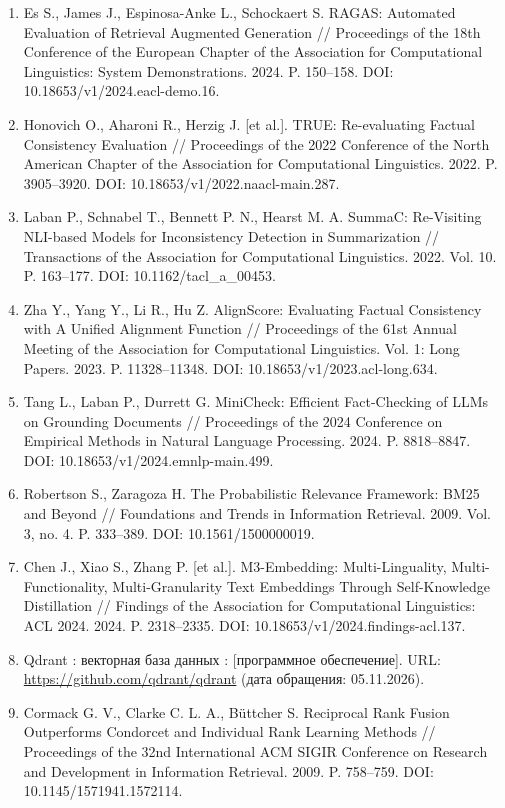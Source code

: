 \documentclass[14pt,a4paper]{extarticle}
\begin{document}
\begin{singlespace*}
\begin{enumerate}
\item \foreignlanguage{english}{Es S., James J., Espinosa-Anke L., Schockaert S. RAGAS: Automated Evaluation of Retrieval Augmented Generation // Proceedings of the 18th Conference of the European Chapter of the Association for Computational Linguistics: System Demonstrations. 2024. P. 150–158. DOI: 10.18653/v1/2024.eacl-demo.16.}
\item \foreignlanguage{english}{Honovich O., Aharoni R., Herzig J. [et al.]. TRUE: Re-evaluating Factual Consistency Evaluation // Proceedings of the 2022 Conference of the North American Chapter of the Association for Computational Linguistics. 2022. P. 3905–3920. DOI: 10.18653/v1/2022.naacl-main.287.}
\item \foreignlanguage{english}{Laban P., Schnabel T., Bennett P. N., Hearst M. A. SummaC: Re-Visiting NLI-based Models for Inconsistency Detection in Summarization // Transactions of the Association for Computational Linguistics. 2022. Vol. 10. P. 163–177. DOI: 10.1162/tacl\_a\_00453.}
\item \foreignlanguage{english}{Zha Y., Yang Y., Li R., Hu Z. AlignScore: Evaluating Factual Consistency with A Unified Alignment Function // Proceedings of the 61st Annual Meeting of the Association for Computational Linguistics. Vol. 1: Long Papers. 2023. P. 11328–11348. DOI: 10.18653/v1/2023.acl-long.634.}
\item \foreignlanguage{english}{Tang L., Laban P., Durrett G. MiniCheck: Efficient Fact-Checking of LLMs on Grounding Documents // Proceedings of the 2024 Conference on Empirical Methods in Natural Language Processing. 2024. P. 8818–8847. DOI: 10.18653/v1/2024.emnlp-main.499.}
\item \foreignlanguage{english}{Robertson S., Zaragoza H. The Probabilistic Relevance Framework: BM25 and Beyond // Foundations and Trends in Information Retrieval. 2009. Vol. 3, no. 4. P. 333–389. DOI: 10.1561/1500000019.}
\item \foreignlanguage{english}{Chen J., Xiao S., Zhang P. [et al.]. M3-Embedding: Multi-Linguality, Multi-Functionality, Multi-Granularity Text Embeddings Through Self-Knowledge Distillation // Findings of the Association for Computational Linguistics: ACL 2024. 2024. P. 2318–2335. DOI: 10.18653/v1/2024.findings-acl.137.}
\item Qdrant : векторная база данных : [программное обеспечение]. URL: \url{https://github.com/qdrant/qdrant} (дата обращения: 05.11.2026).
\item \foreignlanguage{english}{Cormack G. V., Clarke C. L. A., Büttcher S. Reciprocal Rank Fusion Outperforms Condorcet and Individual Rank Learning Methods // Proceedings of the 32nd International ACM SIGIR Conference on Research and Development in Information Retrieval. 2009. P. 758–759. DOI: 10.1145/1571941.1572114.}

\end{enumerate}
\end{singlespace*}
\end{document}
